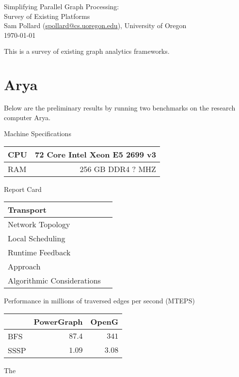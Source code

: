 \documentclass[11pt]{article}
\begin{document}
\begin{center}
{ \huge
	Simplifying Parallel Graph Processing: \\
}
{ \Large
	Survey of Existing Platforms \\
}
Sam Pollard (\href{mailto:spollard@cs.uoregon.edu}{spollard@cs.uoregon.edu}), University of Oregon \\
\today
\end{center}

This is a survey of existing graph analytics frameworks.

\section{Arya}
Below are the preliminary results by running two benchmarks on the research computer Arya.

Machine Specifications


\begin{tabular}{lr}
CPU & 72 Core Intel Xeon E5 2699 v3\\ \hline
RAM & 256 GB DDR4 ? MHZ
\end{tabular}

Report Card

\begin{tabular}{lr}
Transport & \\ \hline
Network Topology & \\ \hline
Local Scheduling & \\ \hline
Runtime Feedback & \\ \hline
Approach & \\ \hline
Algorithmic Considerations & \\ \hline
\end{tabular}

Performance in millions of traversed edges per second (MTEPS)

\begin{tabular}{l|r|r}
 & PowerGraph & OpenG \\ \hline
BFS & $87.4$ & $341$ \\ \hline
SSSP & $1.09$ & $3.08$ \\ \hline
\end{tabular}

The 
\end{document}
